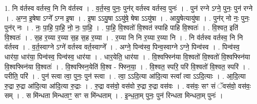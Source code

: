 \documentclass[17pt]{extarticle}
\begin{document}
1. नि व॑र्तस्व वर्तस्व॒ नि नि व॑र्तस्व । . व॒र्त॒स्व॒ पुनः॒ पुन॑र् वर्तस्व वर्तस्व॒ पुनः॑ । . पुन॑ रग्ने ऽग्ने॒ पुनः॒ पुन॑ रग्ने । . अ॒ग्न॒ इ॒षेषा ऽग्ने᳚ ऽग्न इ॒षा । . इ॒षा ऽऽयु॒षा ऽऽयु॑षे॒ षेषा ऽऽयु॑षा । . आयु॒षेत्यायु॑षा । . पुन॑र् नो नः॒ पुनः॒ पुन॑र् नः । . नः॒ पा॒हि॒ पा॒हि॒ नो॒ नः॒ पा॒हि॒ । . पा॒हि॒ वि॒श्वतो॑ वि॒श्वत॑ स्पाहि पाहि वि॒श्वतः॑ । . वि॒श्वत॒ इति॑ वि॒श्वतः॑ । . स॒ह र॒य्या र॒य्या स॒ह स॒ह र॒य्या । . र॒य्या नि नि र॒य्या र॒य्या नि । . नि व॑र्तस्व वर्तस्व॒ नि नि व॑र्तस्व । . व॒र्त॒स्वाग्ने ऽग्ने॑ वर्तस्व वर्त॒स्वाग्ने᳚ । . अग्ने॒ पिन्व॑स्व॒ पिन्व॒स्वाग्ने ऽग्ने॒ पिन्व॑स्व । . पिन्व॑स्व॒ धार॑या॒ धार॑या॒ पिन्व॑स्व॒ पिन्व॑स्व॒ धार॑या । . धार॒येति॒ धार॑या । . वि॒श्वफ्स्नि॑या वि॒श्वतो॑ वि॒श्वतो॑ वि॒श्वफ्स्नि॑या वि॒श्वफ्स्नि॑या वि॒श्वतः॑ । . वि॒श्वफ्स्नि॒येति॑ वि॒श्व - फ्स्नि॒या॒ । . वि॒श्वत॒ स्परि॒ परि॑ वि॒श्वतो॑ वि॒श्वत॒ स्परि॑ । . परीति॒ परि॑ । . पुन॑ स्त्वा त्वा॒ पुनः॒ पुन॑ स्त्वा । . त्वा॒ ऽऽदि॒त्या आ॑दि॒त्या स्त्वा᳚ त्वा ऽऽदि॒त्याः । . आ॒दि॒त्या रु॒द्रा रु॒द्रा आ॑दि॒त्या आ॑दि॒त्या रु॒द्राः । . रु॒द्रा वस॑वो॒ वस॑वो रु॒द्रा रु॒द्रा वस॑वः । . वस॑वः॒ सꣳ सं ॅवस॑वो॒ वस॑वः॒ सम् । . स मि॑न्धता मिन्धताꣳ॒॒ सꣳ स मि॑न्धताम् । . इ॒न्ध॒ता॒म् पुनः॒ पुन॑ रिन्धता मिन्धता॒म् पुनः॑ । \newline
\end{document}
